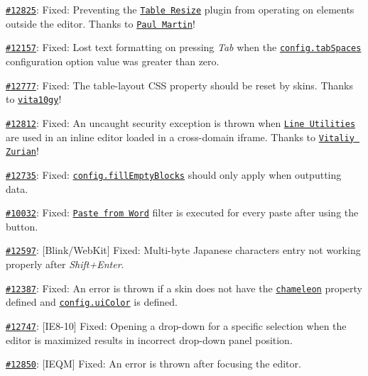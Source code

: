\begin{DoxyItemize}
\item \href{http://dev.ckeditor.com/ticket/12825}{\tt \#12825}\+: Fixed\+: Preventing the \href{http://ckeditor.com/addon/tableresize}{\tt Table Resize} plugin from operating on elements outside the editor. Thanks to \href{https://github.com/Paul-Martin}{\tt Paul Martin}!
\item \href{http://dev.ckeditor.com/ticket/12157}{\tt \#12157}\+: Fixed\+: Lost text formatting on pressing {\itshape Tab} when the \href{http://docs.ckeditor.com/#!/api/CKEDITOR.config-cfg-tabSpaces}{\tt {\ttfamily config.\+tab\+Spaces}} configuration option value was greater than zero.
\item \href{http://dev.ckeditor.com/ticket/12777}{\tt \#12777}\+: Fixed\+: The {\ttfamily table-\/layout} C\+SS property should be reset by skins. Thanks to \href{https://github.com/vita10gy}{\tt vita10gy}!
\item \href{http://dev.ckeditor.com/ticket/12812}{\tt \#12812}\+: Fixed\+: An uncaught security exception is thrown when \href{http://ckeditor.com/addon/lineutils}{\tt Line Utilities} are used in an inline editor loaded in a cross-\/domain {\ttfamily iframe}. Thanks to \href{https://github.com/thecatontheflat}{\tt Vitaliy Zurian}!
\item \href{http://dev.ckeditor.com/ticket/12735}{\tt \#12735}\+: Fixed\+: \href{http://docs.ckeditor.com/#!/api/CKEDITOR.config-cfg-fillEmptyBlocks}{\tt {\ttfamily config.\+fill\+Empty\+Blocks}} should only apply when outputting data.
\item \href{http://dev.ckeditor.com/ticket/10032}{\tt \#10032}\+: Fixed\+: \href{http://ckeditor.com/addon/pastefromword}{\tt Paste from Word} filter is executed for every paste after using the button.
\item \href{http://dev.ckeditor.com/ticket/12597}{\tt \#12597}\+: \mbox{[}Blink/\+Web\+Kit\mbox{]} Fixed\+: Multi-\/byte Japanese characters entry not working properly after {\itshape Shift+\+Enter}.
\item \href{http://dev.ckeditor.com/ticket/12387}{\tt \#12387}\+: Fixed\+: An error is thrown if a skin does not have the \href{http://docs.ckeditor.com/#!/api/CKEDITOR.skin-method-chameleon}{\tt {\ttfamily chameleon}} property defined and \href{http://docs.ckeditor.com/#!/api/CKEDITOR.config-cfg-uiColor}{\tt {\ttfamily config.\+ui\+Color}} is defined.
\item \href{http://dev.ckeditor.com/ticket/12747}{\tt \#12747}\+: \mbox{[}I\+E8-\/10\mbox{]} Fixed\+: Opening a drop-\/down for a specific selection when the editor is maximized results in incorrect drop-\/down panel position.
\item \href{http://dev.ckeditor.com/ticket/12850}{\tt \#12850}\+: \mbox{[}I\+E\+QM\mbox{]} Fixed\+: An error is thrown after focusing the editor.
\end{DoxyItemize}

